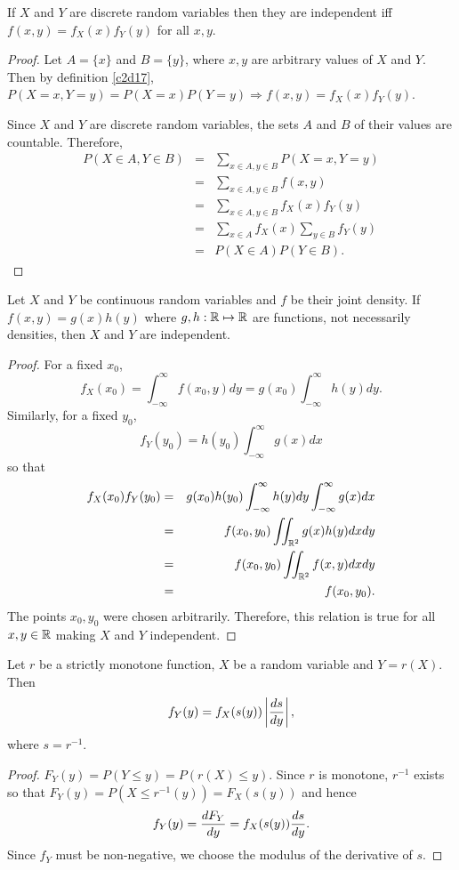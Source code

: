 \documentclass{article}
\begin{document}
\begin{prop}\label{c2p6}
If $X$ and $Y$ are discrete random variables then they are independent iff
$f(x, y) = f_X(x)f_Y(y)$ for all $x, y$.
\end{prop}
\begin{proof}
Let $A = \{x\}$ and $B = \{y\}$, where $x, y$ are arbitrary values of $X$ and
$Y$. Then by definition \ref{c2d17}, $P(X=x, Y=y) = P(X=x)P(Y=y) \Rightarrow
f(x, y) = f_X(x)f_Y(y)$.

Since $X$ and $Y$ are discrete random variables, the sets $A$ and $B$ of their
values are countable. Therefore,
\begin{eqnarray*}
P(X \in A, Y \in B) &=& \sum_{x \in A, y \in B}P(X = x, Y = y) \\
 &=& \sum_{x \in A, y \in B}f(x, y) \\
 &=& \sum_{x\in A, y \in B}f_X(x)f_Y(y) \\
 &=& \sum_{x \in A}f_X(x)\sum_{y \in B}f_Y(y) \\
 &=& P(X \in A)P(Y \in B).
\end{eqnarray*}
\end{proof}

\begin{prop}\label{c2p7}
Let $X$ and $Y$ be continuous random variables and $f$ be their joint density.
If $f(x, y) = g(x)h(y)$ where $g, h: \mathbb{R} \mapsto \mathbb{R}$ are functions, not
necessarily densities, then $X$ and $Y$ are independent.
\end{prop}
\begin{proof}
For a fixed $x_0$,
\[
f_X(x_0) = \int_{-\infty}^\infty f(x_0, y)dy = g(x_0)\int_{-\infty}^\infty h(y)dy.
\]
Similarly, for a fixed $y_0$,
\[
f_Y(y_0) = h(y_0)\int_{-\infty}^\infty g(x)dx
\]
so that
\begin{eqnarray*}
f_X(x_0)f_Y(y_0) &=& 
	g(x_0)h(y_0)\int_{-\infty}^\infty h(y)dy\int_{-\infty}^\infty g(x)dx \\
 &=& f(x_0, y_0)\iint_{\mathbb{R}^2}g(x)h(y)dxdy \\
 &=& f(x_0, y_0)\iint_{\mathbb{R}^2}f(x, y)dxdy \\
 &=& f(x_0, y_0).
\end{eqnarray*}
The points $x_0, y_0$ were chosen arbitrarily. Therefore, this relation is true
for all $x, y \in \mathbb{R}$ making $X$ and $Y$ independent.
\end{proof}

\begin{prop}\label{c2p8}
Let $r$ be a strictly monotone function, $X$ be a random variable and $Y=r(X)$.
Then
\[
f_Y(y) = f_X(s(y))\left|\frac{d{s}}{d{y}}\right|,
\]
where $s = r^{-1}$.
\end{prop}
\begin{proof}
$F_Y(y) = P(Y \le y) = P(r(X) \le y)$. Since $r$ is monotone, $r^{-1}$ exists so
that $F_Y(y) = P(X \le r^{-1}(y)) = F_X(s(y))$ and hence
\[
f_Y(y) = \frac{d{F_Y}}{d{y}} = f_X(s(y))\frac{d{s}}{d{y}}.
\]
Since $f_Y$ must be non-negative, we choose the modulus of the derivative of 
$s$.
\end{proof}
\end{document}
